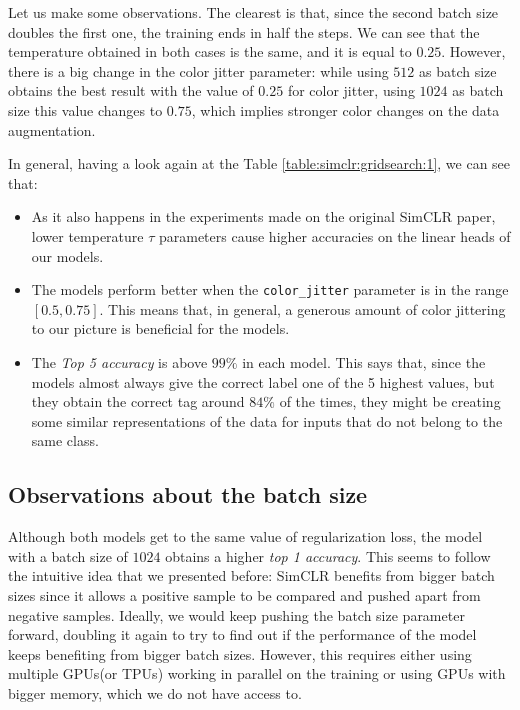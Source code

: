 Let us make some observations. The clearest is that, since the second batch size doubles the first one, the training ends in half the steps. We can see that the temperature obtained in both cases is the same, and it is equal to $0.25$. However, there is a big change in the color jitter parameter: while using $512$ as batch size obtains the best result with the value of $0.25$ for color jitter, using $1024$ as batch size this value changes to $0.75$, which implies stronger color changes on the data augmentation. 

In general, having a look again at the Table \ref{table:simclr:gridsearch:1},  we can see that:

\begin{itemize}
    \item As it also happens in the experiments made on the original SimCLR paper, lower temperature $\tau$ parameters cause higher accuracies on the linear heads of our models.
    
    \item The models perform better when the \lstinline{color_jitter} parameter is in the range $[0.5,0.75]$. This means that, in general, a generous amount of color jittering to our picture is beneficial for the models.

    \item The \emph{Top 5 accuracy} is above $99\%$ in each model. This says that, since the models almost always give the correct label one of the 5 highest values, but they obtain the correct tag around $84\%$ of the times, they might be creating some similar representations of the data for inputs that do not belong to the same class. 
\end{itemize}

\subsection*{Observations about the batch size}

Although both models get to the same value of regularization loss, the model with a batch size of $1024$ obtains a higher \emph{top 1 accuracy}. This seems to follow the intuitive idea that we presented before: SimCLR benefits from bigger batch sizes since it allows a positive sample to be compared and pushed apart from negative samples. Ideally, we would keep pushing the batch size parameter forward, doubling it again to try to find out if the performance of the model keeps benefiting from bigger batch sizes. However, this requires either using multiple GPUs(or TPUs) working in parallel on the training or using GPUs with bigger memory, which we do not have access to. 

